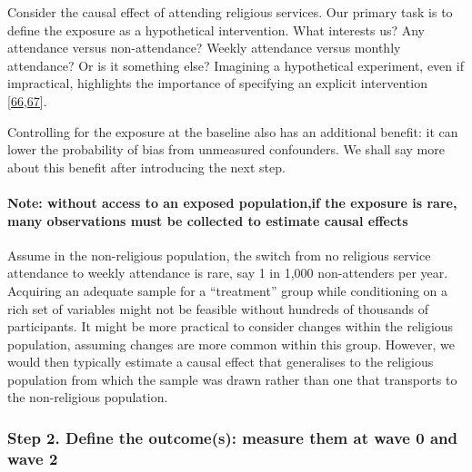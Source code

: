 \documentclass[
  singlecolumn]{article}
\let\oldparagraph\paragraph
\renewcommand{\paragraph}[1]{\oldparagraph{#1}\mbox{}}
\begin{document}
Consider the causal effect of attending religious services. Our primary
task is to define the exposure as a hypothetical intervention. What
interests us? Any attendance versus non-attendance? Weekly attendance
versus monthly attendance? Or is it something else? Imagining a
hypothetical experiment, even if impractical, highlights the importance
of specifying an explicit intervention
{[}\protect\hyperlink{ref-hernuxe1n2022}{66},\protect\hyperlink{ref-hernuxe1n2016a}{67}{]}.

Controlling for the exposure at the baseline also has an additional
benefit: it can lower the probability of bias from unmeasured
confounders. We shall say more about this benefit after introducing the
next step.

\hypertarget{note-without-access-to-an-exposed-populationif-the-exposure-is-rare-many-observations-must-be-collected-to-estimate-causal-effects}{%
\paragraph{\texorpdfstring{\textbf{Note: without access to an exposed
population,if the exposure is rare, many observations must be collected
to estimate causal
effects}}{Note: without access to an exposed population,if the exposure is rare, many observations must be collected to estimate causal effects}}\label{note-without-access-to-an-exposed-populationif-the-exposure-is-rare-many-observations-must-be-collected-to-estimate-causal-effects}}

Assume in the non-religious population, the switch from no religious
service attendance to weekly attendance is rare, say 1 in 1,000
non-attenders per year. Acquiring an adequate sample for a ``treatment''
group while conditioning on a rich set of variables might not be
feasible without hundreds of thousands of participants. It might be more
practical to consider changes within the religious population, assuming
changes are more common within this group. However, we would then
typically estimate a causal effect that generalises to the religious
population from which the sample was drawn rather than one that
transports to the non-religious population.

\hypertarget{step-2.-define-the-outcomes-measure-them-at-wave-0-and-wave-2}{%
\subsubsection{Step 2. Define the outcome(s): measure them at wave 0 and
wave
2}\label{step-2.-define-the-outcomes-measure-them-at-wave-0-and-wave-2}}
\end{document}
